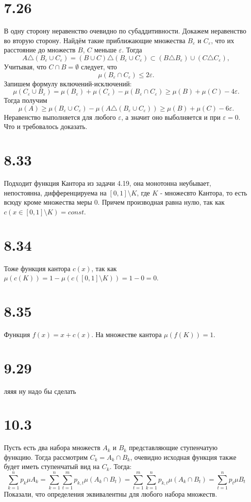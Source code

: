 \documentclass[12pt]{article}
\begin{document}
\section{7.26}
В одну сторону неравенство очевидно по субаддитивности. Докажем неравенство во вторую сторону. 
Найдём такие приближающие множества $B_{\varepsilon}$ и $C_{\varepsilon}$, что их расстояние до 
множеств $B$, $C$ меньше $\varepsilon$. Тогда
\[
    A \triangle (B_{\varepsilon}  \cup C_{\varepsilon}) = 
    (B \cup C) \triangle (B_{\varepsilon}  \cup C_{\varepsilon}) \subset 
    (B \triangle B_{\varepsilon } ) \cup (C  \triangle C_{\varepsilon}),
\]
Учитывая, что $C \cap B = \emptyset$ следует, что 
\[
    \mu(B_{\varepsilon} \cap C_{\varepsilon}) \leq 2\varepsilon. 
\] 
Запишем формулу включений-исключений: 
\[
    \mu(C_{\varepsilon} \cup B_{\varepsilon} ) = \mu(B_{\varepsilon}) + \mu(C_{\varepsilon}) - \mu(B_{\varepsilon} \cap C_{\varepsilon}) \geq \mu(B) + \mu(C) - 4\varepsilon.
\]
Тогда получим 
\[
    \mu(A) \geq \mu(B_{\varepsilon} \cup C_{\varepsilon}) - \mu(A \triangle (B_{\varepsilon}  \cup C_{\varepsilon})) \geq \mu(B) + \mu(C) - 6\varepsilon.
\]
Неравенство выполняется для любого $\varepsilon$, а значит оно выболняется и при $\varepsilon = 0$. Что и требовалось доказать.  

\section{8.33}
Подходит функция Кантора из задачи 4.19, она монотонна неубывает, непостоянна, дифференцируема на $[0,1] \setminus K$, 
где $K$ - множесвто Кантора, то есть всюду кроме множества меры 0. Причем производная равна нулю, так 
как $c(x \in [0, 1] \setminus K) = const$.   
\section{8.34}
Тоже функция кантора $c(x)$, так как $\mu (c(K)) = 1 - \mu (c([0, 1] \setminus K)) = 1 - 0 = 0$. 
\section{8.35}
Функция $f(x) = x + c(x)$. На множестве кантора $\mu (f(K)) = 1$.

\section{9.29}
ляяя ну надо бы сделать
\section{10.3}
Пусть есть два набора множеств $A_k$ и $B_k$ представляющие ступенчатую функцию. Тогда рассмотрим 
$C_k = A_k \cap B_k$, очевидно исходная функция также будет иметь ступенчатый вид на $C_k$. Тогда: 
\[
    \sum_{k=1}^{n} p_k \mu A_k = \sum_{k=1}^{n} \sum_{t=1}^{m} p_{k, t} \mu (A_k \cap B_t) = 
    \sum_{t=1}^{m} \sum_{k=1}^{n} p_{k, t} \mu (A_k \cap B_t) = \sum_{t=1}^{n} p_t \mu B_t
\]     
Показали, что определения эквивалентны для любого набора множеств.
\end{document}

